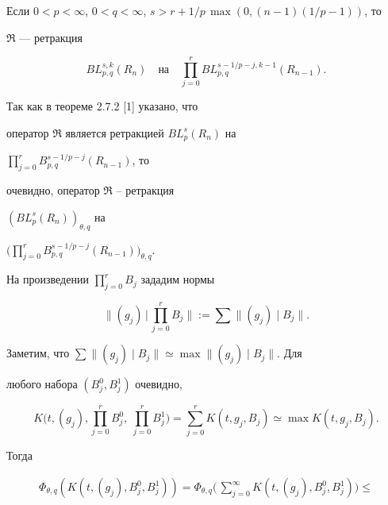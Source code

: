 \begin{thm} 


Если $0<p<\infty$, $0<q<\infty$, $s>r+1/p\,\max(0,(n-1)(1/p-1))$, то 


$\Re$ --- ретракция 


$$ 


BL^{s,k}_{p,q}(R_n)\quad 


\text{на} 


\quad 


\prod^r_{j=0}BL^{s-1/p-j,k-1}_{p,q}(R_{n-1}). 


$$ 


\end{thm} 


 


\begin{pf} 


Так как в теореме 2.7.2 [1] указано, что 


оператор $\Re$ является ретракцией $BL^s_p(R_n)$ на 


$\prod\limits^r_{j=0}B^{s-1/p-j}_{p,q}(R_{n-1})$, то 


очевидно, оператор $\Re$ -- ретракция 


$(BL^s_p(R_n))_{\theta,q}$ на 


$\Big(\prod\limits^r_{j=0}B^{s-1/p-j}_{p,q}(R_{n-1})\Big)_{\theta,q}$. 


На произведении $\prod\limits^r_{j=0}B_j$ зададим нормы 


$$ 


\Big\|(g_j)\,\Big|\,\prod^r_{j=0}B_j\Big\|:=\sum\|(g_j)\mid B_j\|. 


$$ 


Заметим, что $\sum\|(g_j)\mid B_j\|\simeq\max\|(g_j)\mid B_j\|$. Для 


любого набора $(B^0_j,B^1_j)$ очевидно, 


$$ 


K\Big(t,(g_j),\prod^r_{j=0}B^0_j,\ \prod^r_{j=0}B^1_j\Big)= 


\sum^r_{j=0}K(t,g_j,B_j)\simeq \max K(t,g_j,B_j). 


$$ 


Тогда 


\begin{multline*} 


\Phi_{\theta,q}(K(t,(g_j),B^0_j,B^1_j))= 


\Phi_{\theta,q}\Big(\,\sum^\infty_{j=0}K(t,(g_j),B^0_j,B^1_j)\Big) 


\le \\ 



\end{multline*}
\end{pf}
